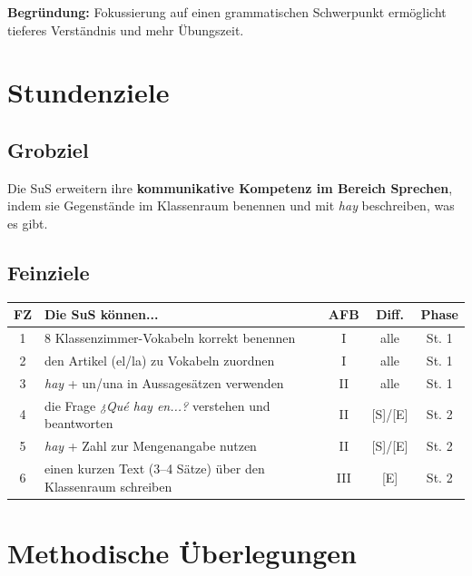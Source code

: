 \documentclass[11pt,a4paper]{article}
\begin{document}
\textbf{Begründung:} Fokussierung auf einen grammatischen Schwerpunkt ermöglicht tieferes Verständnis und mehr Übungszeit.

\section{Stundenziele}

\subsection{Grobziel}

Die SuS erweitern ihre \textbf{kommunikative Kompetenz im Bereich Sprechen}, indem sie Gegenstände im Klassenraum benennen und mit \textit{hay} beschreiben, was es gibt.

\subsection{Feinziele}

\begin{tabular}{|c|p{7.5cm}|c|c|c|}
\hline
\textbf{FZ} & \textbf{Die SuS können...} & \textbf{AFB} & \textbf{Diff.} & \textbf{Phase} \\
\hline
1 & 8 Klassenzimmer-Vokabeln korrekt benennen & I & alle & St. 1 \\
\hline
2 & den Artikel (el/la) zu Vokabeln zuordnen & I & alle & St. 1 \\
\hline
3 & \textit{hay} + un/una in Aussagesätzen verwenden & II & alle & St. 1 \\
\hline
4 & die Frage \textit{¿Qué hay en...?} verstehen und beantworten & II & [S]/[E] & St. 2 \\
\hline
5 & \textit{hay} + Zahl zur Mengenangabe nutzen & II & [S]/[E] & St. 2 \\
\hline
6 & einen kurzen Text (3--4 Sätze) über den Klassenraum schreiben & III & [E] & St. 2 \\
\hline
\end{tabular}

\section{Methodische Überlegungen}
\end{document}
